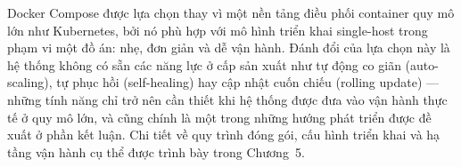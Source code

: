 \documentclass[../DoAn.tex]{subfiles}
\begin{document}
Docker Compose được lựa chọn thay vì một nền tảng điều phối container quy mô lớn như
Kubernetes, bởi nó phù hợp với mô hình triển khai single-host trong phạm vi một đồ án: nhẹ,
đơn giản và dễ vận hành. Đánh đổi của lựa chọn này là hệ thống không có sẵn các năng lực ở
cấp sản xuất như tự động co giãn (auto-scaling), tự phục hồi (self-healing) hay cập nhật cuốn
chiếu (rolling update) --- những tính năng chỉ trở nên cần thiết khi hệ thống được đưa vào
vận hành thực tế ở quy mô lớn, và cũng chính là một trong những hướng phát triển được đề xuất
ở phần kết luận. Chi tiết về quy trình đóng gói, cấu hình triển khai và hạ tầng vận hành cụ
thể được trình bày trong Chương~5.



\end{document}
